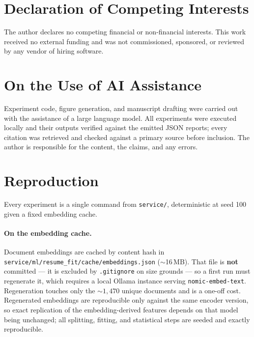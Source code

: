 \documentclass[11pt]{article}                      %
\begin{document}
\section*{Declaration of Competing Interests}

The author declares no competing financial or non-financial interests. This work
received no external funding and was not commissioned, sponsored, or reviewed by
any vendor of hiring software.

\section*{On the Use of AI Assistance}

Experiment code, figure generation, and manuscript drafting were carried out with
the assistance of a large language model. All experiments were executed locally
and their outputs verified against the emitted JSON reports; every citation was
retrieved and checked against a primary source before inclusion. The author is
responsible for the content, the claims, and any errors.




\appendix

\section{Reproduction}
\label{sec:repro}

Every experiment is a single command from \texttt{service/}, deterministic at
seed 100 given a fixed embedding cache.

\paragraph{On the embedding cache.}
Document embeddings are cached by content hash in
\texttt{service/ml/resume\_fit/cache/embeddings.json} ($\sim$16\,MB). That file is
\textbf{not} committed --- it is excluded by \texttt{.gitignore} on size grounds ---
so a first run must regenerate it, which requires a local Ollama instance serving
\texttt{nomic-embed-text}. Regeneration touches only the ${\sim}1{,}470$ unique
documents and is a one-off cost. Regenerated embeddings are reproducible only
against the same encoder version, so exact replication of the embedding-derived
features depends on that model being unchanged; all splitting, fitting, and
statistical steps are seeded and exactly reproducible.
\end{document}
